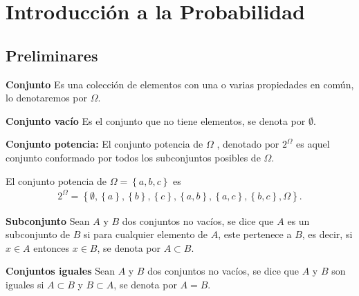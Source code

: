 
\section{Introducci\'on a la Probabilidad}



\subsection{Preliminares}

\begin{Def} \textbf{Conjunto}
Es una colecci\'on de elementos con una o varias propiedades en com\'un, lo denotaremos por $\Omega$.
\end{Def}

\begin{Def} \textbf{Conjunto vac\'io}
Es el conjunto que no tiene elementos, se denota por $\emptyset$.
\end{Def}

\begin{Def} \textbf{Conjunto potencia:}
El conjunto potencia de $\Omega$ , denotado por $2^{\Omega}$ es aquel conjunto conformado por todos los subconjuntos posibles de $\Omega$.
\end{Def}

\begin{Ejem}
El conjunto potencia de $\Omega=\left\{a,b,c\right\}$ es 
\begin{eqnarray*}
2^{\Omega}=\left\{\emptyset, \left\{a\right\},\left\{b\right\},\left\{c\right\},\left\{a,b\right\},\left\{a,c\right\},\left\{b,c\right\},\Omega\right\}.
\end{eqnarray*}
\end{Ejem}

\begin{Def} \textbf{Subconjunto}
Sean $A$ y $B$ dos conjuntos no vac\'ios, se dice que $A$ es un subconjunto de $B$ si para cualquier elemento de $A$, este pertenece a $B$, es decir, si $x\in A$ entonces $x\in B$, se denota por $A\subset B$.
\end{Def}

\begin{Def} \textbf{Conjuntos iguales}
Sean $A$ y $B$ dos conjuntos no vac\'ios, se dice que $A$ y $B$ son iguales si $A\subset B$ y $B\subset A$, se denota por $A=B$.
\end{Def}


